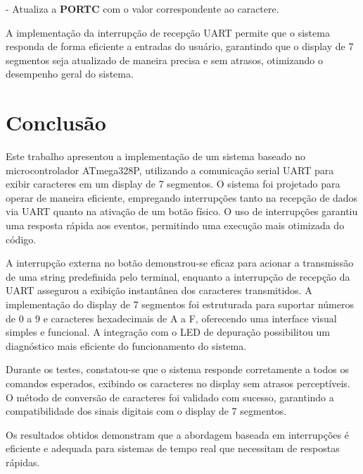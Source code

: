 \documentclass{sbrt}
\begin{document}
- Atualiza a \textbf{PORTC} com o valor correspondente ao caractere.

A implementação da interrupção de recepção UART permite que o sistema responda de forma eficiente a entradas do usuário, garantindo que o display de 7 segmentos seja atualizado de maneira precisa e sem atrasos, otimizando o desempenho geral do sistema.

\section{Conclusão}

Este trabalho apresentou a implementação de um sistema baseado no microcontrolador ATmega328P, utilizando a comunicação serial UART para exibir caracteres em um display de 7 segmentos. O sistema foi projetado para operar de maneira eficiente, empregando interrupções tanto na recepção de dados via UART quanto na ativação de um botão físico. O uso de interrupções garantiu uma resposta rápida aos eventos, permitindo uma execução mais otimizada do código.

A interrupção externa no botão demonstrou-se eficaz para acionar a transmissão de uma string predefinida pelo terminal, enquanto a interrupção de recepção da UART assegurou a exibição instantânea dos caracteres transmitidos. A implementação do display de 7 segmentos foi estruturada para suportar números de 0 a 9 e caracteres hexadecimais de A a F, oferecendo uma interface visual simples e funcional. A integração com o LED de depuração possibilitou um diagnóstico mais eficiente do funcionamento do sistema.

Durante os testes, constatou-se que o sistema responde corretamente a todos os comandos esperados, exibindo os caracteres no display sem atrasos perceptíveis. O método de conversão de caracteres foi validado com sucesso, garantindo a compatibilidade dos sinais digitais com o display de 7 segmentos.

Os resultados obtidos demonstram que a abordagem baseada em interrupções é eficiente e adequada para sistemas de tempo real que necessitam de respostas rápidas.
\end{document}
